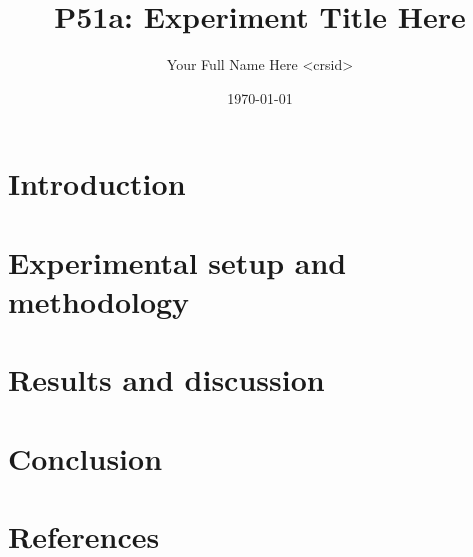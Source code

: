 \documentclass[a4paper,10pt]{article}
\begin{document}
\title{P51a: Experiment Title Here}
\author{Your Full Name Here \textless{}crsid\textgreater{}}
\date{\today}

\maketitle

\thispagestyle{empty}

\begin{abstract}
\end{abstract}

\clearpage

\setcounter{page}{1}

\section{Introduction}

\section{Experimental setup and methodology}

\section{Results and discussion}

\section{Conclusion}

\section{References}

\end{document}
